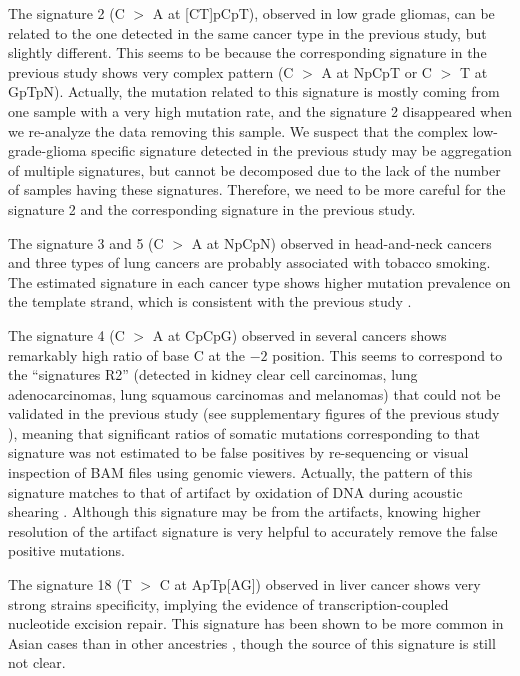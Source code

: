 The signature 2 (C $>$ A at [CT]pCpT), observed in low grade gliomas, can be related to the one detected in the same cancer type in the previous study, but slightly different. 
This seems to be because the corresponding signature in the previous study shows very complex pattern (C $>$ A at NpCpT or C $>$ T at GpTpN).
Actually, the mutation related to this signature is mostly coming from one sample with a very high mutation rate, 
and the signature 2 disappeared when we re-analyze the data removing this sample.
We suspect that the complex low-grade-glioma specific signature detected in the previous study may be aggregation of multiple signatures,
but cannot be decomposed due to the lack of the number of samples having these signatures.
Therefore, we need to be more careful for the signature 2 and the corresponding signature in the previous study.


The signature 3 and 5 (C $>$ A at NpCpN) observed in head-and-neck cancers and three types of lung cancers are probably associated with tobacco smoking.
The estimated signature in each cancer type shows higher mutation prevalence on the template strand, which is consistent with the previous study \cite{pmid12379884, pmid23318258}.


The signature 4 (C $>$ A at CpCpG) observed in several cancers shows remarkably high ratio of base C at the $-2$ position.
This seems to correspond to the ``signatures R2''  (detected in kidney clear cell carcinomas, lung adenocarcinomas, lung squamous carcinomas and melanomas) 
that could not be validated in the previous study (see supplementary figures of the previous study \cite{pmid23318258}),
meaning that significant ratios of somatic mutations corresponding to that signature was not estimated to be false positives by re-sequencing or visual inspection of BAM files using genomic viewers.
Actually, the pattern of this signature matches to that of artifact by oxidation of DNA during acoustic shearing \cite{pmid23303777}.
Although this signature may be from the artifacts, knowing higher resolution of the artifact signature is very helpful to accurately remove the false positive mutations.


The signature 18 (T $>$ C at ApTp[AG]) observed in liver cancer shows very strong strains specificity, implying the evidence of transcription-coupled nucleotide excision repair.
This signature has been shown to be more common in Asian cases than in other ancestries \cite{pmid25362482}, though the source of this signature is still not clear.


